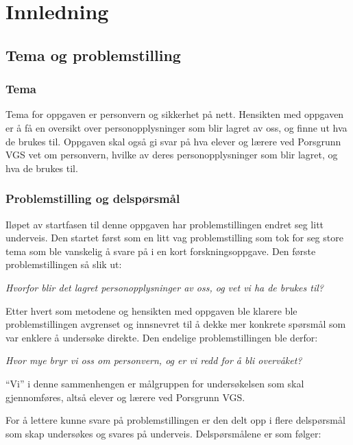 \section{Innledning}

\subsection{Tema og problemstilling}\label{subsec:problemstilling}

\subsubsection{Tema}
Tema for oppgaven er personvern og sikkerhet på nett. Hensikten med oppgaven er å få en oversikt over personopplysninger som blir lagret av oss, og finne ut hva de brukes til. Oppgaven skal også gi svar på hva elever og lærere ved Porsgrunn VGS vet om personvern, hvilke av deres personopplysninger som blir lagret, og hva de brukes til.

\subsubsection{Problemstilling og delspørsmål}\label{subsubsec:problemstilling}
Iløpet av startfasen til denne oppgaven har problemstillingen endret seg litt underveis. Den startet først som en litt vag problemstilling som tok for seg store tema som ble vanskelig å svare på i en kort forskningsoppgave. Den første problemstillingen så slik ut:

\textit{Hvorfor blir det lagret personopplysninger av oss, og vet vi ha de brukes til?}

Etter hvert som metodene og hensikten med oppgaven ble klarere ble problemstillingen avgrenset og innsnevret til å dekke mer konkrete spørsmål som var enklere å undersøke direkte. Den endelige problemstillingen ble derfor:

\textit{Hvor mye bryr vi oss om personvern, og er vi redd for å bli overvåket?}

``Vi'' i denne sammenhengen er målgruppen for undersøkelsen som skal gjennomføres, altså elever og lærere ved Porsgrunn VGS. 

For å lettere kunne svare på problemstillingen er den delt opp i flere delspørsmål som skap undersøkes og svares på underveis. Delspørsmålene er som følger:

